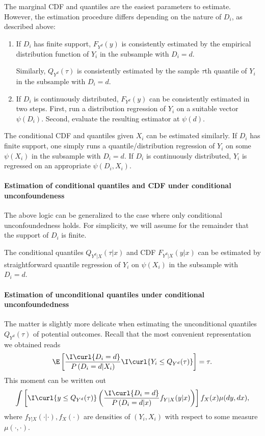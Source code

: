    The marginal CDF and quantiles are the easiest parameters to estimate. However, the estimation procedure differs depending on the nature of $D_i$, as described above:
   \begin{enumerate}
   	\item If $D_i$ has finite support, $F_{Y^d}(y)$ is consistently estimated by the empirical distribution function of $Y_i$ in the subsample with $D_i=d$.
   	
   	Similarly, $Q_{Y^d}(\tau)$ is consistently estimated by the sample $\tau$th quantile of $Y_i$ in the subsample with $D_i=d$.
   	
   	
   	\item If $D_i$ is continuously distributed, $F_{Y^d}(y)$ can be consistently estimated in two steps. First, run a distribution regression of $Y_i$ on a suitable vector $\psi(D_i)$. Second, evaluate the resulting estimator at $\psi(d)$.
   \end{enumerate}
The conditional CDF and quantiles given $X_i$ can be estimated similarly. If $D_i$ has finite support, one simply runs a quantile/distribution regression of $Y_i$ on  some $\psi(X_i)$ in the subsample with $D_i=d$. If $D_i$ is continuously distributed, $Y_i$ is regressed on an appropriate $\psi(D_i, X_i)$. 
   
  
  \paragraph{Estimation of conditional quantiles and CDF under conditional unconfoundeness}
  
  The above logic can be generalized to the case where only conditional unconfoundedness holds.   For simplicity, we will assume for the remainder that the support of $D_i$ is finite. 
  
  The conditional quantiles $Q_{Y^d|X}(\tau|x)$ and CDF $F_{Y^d|X}(y|x)$ can be estimated by straightforward quantile regression of $Y_i$ on $\psi(X_i)$ in the subsample with $D_i=d$.
 
 \paragraph{Estimation of unconditional quantiles under conditional unconfoundedness}
 
 The matter is slightly more delicate when estimating the unconditional quantiles $Q_{Y^d}(\tau)$ of potential outcomes. Recall that the most convenient representation we obtained reads
 \begin{equation}
 \E\left[  \dfrac{\I\curl{D_i=d} }{P\left(D_i=d|X_i\right)}\I\curl{Y_i\leq Q_{Y^d}(\tau) }\right] = \tau. 	 
 \end{equation}
  This moment can be written out
  \begin{equation}
  	 \int  \left[  \I\curl{y\leq Q_{Y^d}(\tau) }  \left(  \dfrac{\I\curl{D_i=d} }{P\left(D_i=d|x\right)}f_{Y|X}(y| x) \right) \right] f_{X}(x)\mu(dy, dx),
  \end{equation}
 where $ f_{Y|X}(\cdot|\cdot), f_{X}(\cdot)$ are densities of $(Y_i, X_i)$ with respect to some measure $\mu(\cdot, \cdot)$.
 
